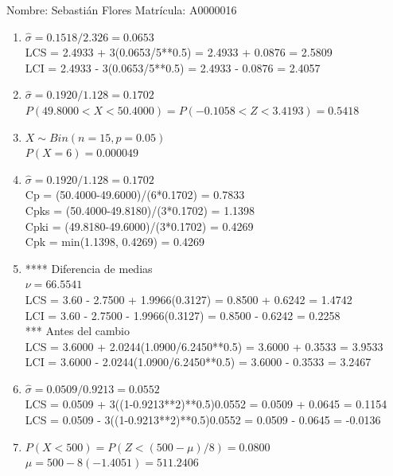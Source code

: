 \documentclass[8pt]{report}
\begin{document}
 \newpage

Nombre: \underline{\hspace*{.2in}}
Sebastián Flores
\underline{\hspace*{.2in}} \quad Matr\'icula:\underline{\hspace*{.2in}}
A0000016
\underline{\hspace*{.2in}} \\

\begin{enumerate}
\item $\hat\sigma = 0.1518/2.326 = 0.0653$\\
LCS = 2.4933 + 3(0.0653/5**0.5) = 2.4933 + 0.0876 = 2.5809\\
LCI = 2.4933 - 3(0.0653/5**0.5) = 2.4933 - 0.0876 = 2.4057
\item $\hat\sigma = 0.1920/1.128 = 0.1702$\\
$P(49.8000 < X < 50.4000) = P(-0.1058 < Z < 3.4193) = 0.5418$\\
\item $X \sim Bin(n=15, p=0.05)$\\
$P(X = 6) = 0.000049$
\item $\hat\sigma = 0.1920/1.128 = 0.1702$\\
Cp = (50.4000-49.6000)/(6*0.1702) = 0.7833\\
Cpks = (50.4000-49.8180)/(3*0.1702) = 1.1398\\
Cpki = (49.8180-49.6000)/(3*0.1702) = 0.4269\\
Cpk = min(1.1398, 0.4269) = 0.4269
\item **** Diferencia de medias\\
$\nu = 66.5541$\\
LCS = 3.60 - 2.7500 + 1.9966(0.3127) = 0.8500 + 0.6242 = 1.4742\\
LCI = 3.60 - 2.7500 - 1.9966(0.3127) = 0.8500 - 0.6242 = 0.2258\\
*** Antes del cambio\\
LCS = 3.6000 + 2.0244(1.0900/6.2450**0.5) = 3.6000 + 0.3533 = 3.9533\\
LCI = 3.6000 - 2.0244(1.0900/6.2450**0.5) = 3.6000 - 0.3533 = 3.2467\\
\item $\hat\sigma = 0.0509/0.9213 = 0.0552$\\
LCS = 0.0509 + 3((1-0.9213**2)**0.5)0.0552 = 0.0509 + 0.0645 = 0.1154\\
LCS = 0.0509 - 3((1-0.9213**2)**0.5)0.0552 = 0.0509 - 0.0645 = -0.0136
\item $P(X < 500) = P(Z < (500-\mu)/8) = 0.0800$\\
$\mu = 500 - 8(-1.4051) = 511.2406$\\
\end{enumerate}
\end{document}
